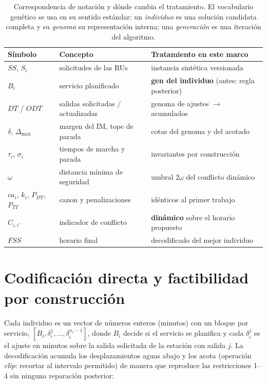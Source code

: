 \documentclass[11pt,a4paper]{article}
\newcommand{\ru}{\textup{RU}}
\begin{document}
\begin{table}[t]
\centering
\small
\begin{tabular}{@{}lll@{}}
\toprule
Símbolo & Concepto & Tratamiento en este marco \\
\midrule
$SS$, $S_i$ & solicitudes de las \ru{}s & instancia sintética versionada \\
$B_i$ & servicio planificado & \textbf{gen del individuo} (antes: regla posterior) \\
$DT$ / $ODT$ & salidas solicitadas / actualizadas & genoma de ajustes $\to$ acumulados \\
$\delta$, $\Delta_{\max}$ & margen del IM, tope de parada & cotas del genoma y del acotado \\
$\tau_i$, $\sigma_i$ & tiempos de marcha y parada & invariantes por construcción \\
$\omega$ & distancia mínima de seguridad & umbral $2\omega$ del conflicto dinámico \\
$ca_i$, $k_i$, $P_{DT}$, $P_{TT}$ & canon y penalizaciones & idénticos al primer trabajo \\
$C_{i,i'}$ & indicador de conflicto & \textbf{dinámico} sobre el horario propuesto \\
$FSS$ & horario final & decodificado del mejor individuo \\
\bottomrule
\end{tabular}
\caption{Correspondencia de notación y dónde cambia el tratamiento. El
vocabulario genético se usa en su sentido estándar: un \emph{individuo} es
una solución candidata completa y su \emph{genoma} su representación
interna; una \emph{generación} es una iteración del algoritmo.}
\label{tab:notacion}
\end{table}

\section{Codificación directa y factibilidad por construcción}
\label{sec:codificacion}

Cada individuo es un vector de números enteros (minutos) con un bloque por
servicio, $[B_i, \delta_i^1, \dots, \delta_i^{n_i-1}]$, donde $B_i$ decide
si el servicio se planifica y cada $\delta_i^j$ es el ajuste en minutos
sobre la salida solicitada de la estación con salida $j$. La decodificación
acumula los desplazamientos aguas abajo y los acota (operación
\emph{clip}: recortar al intervalo permitido) de manera que reproduce las
restricciones 1--4 sin ninguna reparación posterior:
\end{document}
